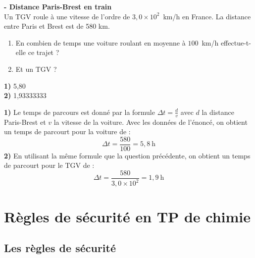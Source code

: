 \begin{mdframed}[style=autreexo]
\textbf{ - Distance Paris-Brest en train}\\
 Un TGV roule à une vitesse de l'ordre de $3,0\times 10^{2}$~km/h en France. La distance entre Paris et Brest est de 580 km.
\begin{enumerate}
\item En combien de temps une voiture roulant en moyenne à $100$~km/h effectue-t-elle ce trajet ?
\item Et un TGV ?
\end{enumerate}
\end{mdframed}

\begin{minipage}{0.5\textwidth}
    \begin{tcolorbox}[colback=red!5!white,colframe=red!75!black,title=\textbf{Mauvaise rédaction : }]
    \textbf{1)} 5,80 \\
    \textbf{2)} 1,93333333\\
    \end{tcolorbox}
\end{minipage}
\begin{minipage}{0.5\textwidth}
    \begin{tcolorbox}[colback=green!5!white,colframe=green!75!black,title=\textbf{Bonne rédaction : }]
    \textbf{1)} Le temps de parcours est donné par la formule $\Delta t=\frac{d}{v}$ avec $d$ la distance Paris-Brest et $v$ la vitesse de la voiture. Avec les données de l'énoncé, on obtient un temps de parcourt pour la voiture de :
    \begin{equation*}
        \Delta t = \frac{580}{100} = 5,8~\text{h}
    \end{equation*}
    \textbf{2)} En utilisant la même formule que la question précédente, on obtient un temps de parcourt pour le TGV de :
     \begin{equation*}
        \Delta t = \frac{580}{3,0\times 10^2} = 1,9~\text{h}
    \end{equation*}
    \end{tcolorbox}
\end{minipage}


\section{Règles de sécurité en TP de chimie}
\subsection{Les règles de sécurité}
\begin{tcolorbox}[colback=red!5!white,colframe=red!75!black,title=\textbf{En TP de chimie :}]
\vspace{10cm}
\end{tcolorbox}


